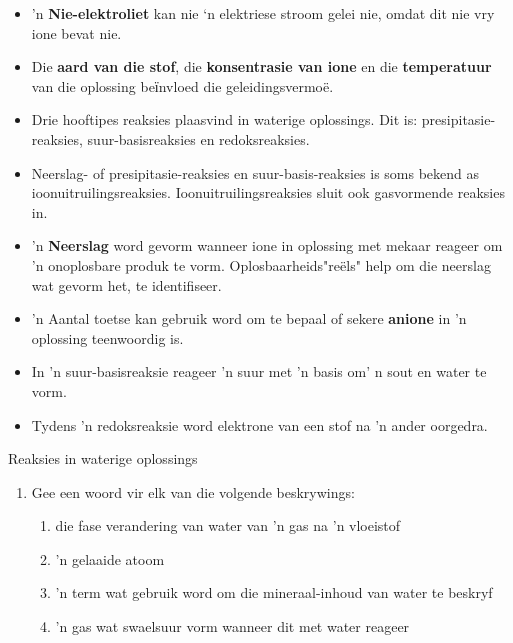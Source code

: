{{\begin{itemize}[noitemsep]
\label{m38719*uid102}\item 'n \textbf{Nie-elektroliet} kan nie ‘n elektriese stroom gelei nie, omdat dit nie vry ione bevat nie.
\label{m38719*uid103}\item Die \textbf{aard van die stof}, die \textbf{konsentrasie van ione} en die \textbf{temperatuur} van die oplossing beїnvloed die geleidingsvermo\"{e}.
\label{m38719*uid0253}\item Drie hooftipes reaksies plaasvind in waterige oplossings. Dit is: presipitasie-reaksies, suur-basisreaksies en redoksreaksies.
\label{m38719*uid8923}\item Neerslag- of presipitasie-reaksies en suur-basis-reaksies is soms bekend as ioonuitruilingsreaksies. Ioonuitruilingsreaksies sluit ook gasvormende reaksies in.
\label{m38719*uid104}\item 'n \textbf{Neerslag} word gevorm wanneer ione in oplossing met mekaar reageer om 'n onoplosbare produk te vorm. Oplosbaarheids"re\"{e}ls" help om die neerslag wat gevorm het, te identifiseer.
\label{m38719*uid105}\item 'n Aantal toetse kan gebruik word om te bepaal of sekere \textbf{anione} in 'n oplossing teenwoordig is.
\label{m38719*id813}\item In 'n suur-basisreaksie reageer 'n suur met 'n basis om' n sout en water te vorm.
\label{m38719*uid823}\item Tydens 'n redoksreaksie word elektrone van een stof na 'n ander oorgedra. 
\end{itemize}
\label{m38719*eip-896}
            \begin{eocexercises}{Reaksies in waterige oplossings}
            \nopagebreak
            \label{m38719*id342869}\begin{enumerate}[noitemsep, label=\textbf{\arabic*}. ] 
            \label{m38719*uid107}\item Gee een woord vir elk van die volgende beskrywings:
\label{m38719*id342885}\begin{enumerate}[noitemsep, label=\textbf{\alph*}. ] 
            \label{m38719*uid108}\item die fase verandering van water van 'n gas na 'n vloeistof
\label{m38719*uid109}\item 'n gelaaide atoom
\label{m38719*uid110}\item 'n term wat gebruik word om die mineraal-inhoud van water te beskryf
\label{m38719*uid111}\item 'n gas wat swaelsuur vorm wanneer dit met water reageer
\end{enumerate}

\end{enumerate}
\end{eocexercises}}}
